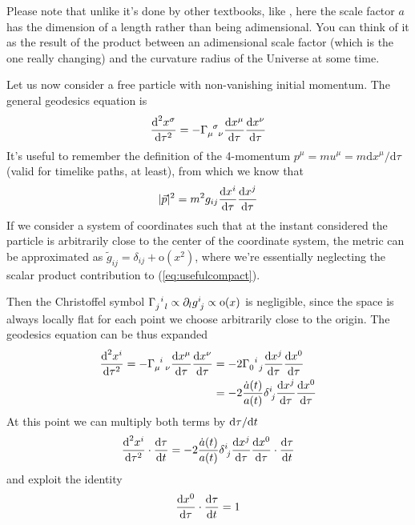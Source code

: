 Please note that unlike it's done by other textbooks, like \cite{carroll}, here the scale factor $a$ has the dimension of a length rather than being adimensional. You can think of it as the result of the product between an adimensional scale factor (which is the one really changing) and the curvature radius of the Universe at some time.
\par Let us now consider a free particle with non-vanishing initial momentum. The general geodesics equation is
\begin{equation}
    \frac{\text{d}^{2}x^{\sigma}}{\text{d}\tau^{2}} = -\Gamma_{\mu\;\;\nu}^{\;\;\sigma}\frac{\text{d}x^{\mu}}{\text{d}\tau}\frac{\text{d}x^{\nu}}{\text{d}\tau}
    \label{eq:geodesicsequation}
\end{equation}
It's useful to remember the definition of the 4-momentum $p^{\mu} = mu^{\mu} = m\text{d}x^{\mu}/\text{d}\tau$ (valid for timelike paths, at least), from which we know that
\begin{equation*}
    |\vec{p}|^{2} = m^{2}g_{ij}\frac{\text{d}x^{i}}{\text{d}\tau}\frac{\text{d}x^{j}}{\text{d}\tau}
\end{equation*}
If we consider a system of coordinates such that at the instant considered the particle is arbitrarily close to the center of the coordinate system, the metric can be approximated as $\tilde{g}_{ij} = \delta_{ij} + \text{o}(x^{2})$, where we're essentially neglecting the scalar product contribution to (\ref{eq:usefulcompact}).
\par Then the Christoffel symbol $\Gamma_{j\;\;l}^{\;\;i} \propto \partial_{l}g^{i}_{\;j} \propto \text{o}(x)$ is negligible, since the space is always locally flat for each point we choose arbitrarily close to the origin. The geodesics equation can be thus expanded 
\begin{align*}
    \frac{\text{d}^{2}x^{i}}{\text{d}\tau^{2}} = -\Gamma_{\mu\;\;\nu}^{\;\;i}\frac{\text{d}x^{\mu}}{\text{d}\tau}\frac{\text{d}x^{\nu}}{\text{d}\tau} &= -2\Gamma_{0\;\;j}^{\;\;i}\frac{\text{d}x^{j}}{\text{d}\tau}\frac{\text{d}x^{0}}{\text{d}\tau}\\
    & = -2\frac{\dot{a}(t)}{a(t)}\delta^{i}_{\;j}\frac{\text{d}x^{j}}{\text{d}\tau}\frac{\text{d}x^{0}}{\text{d}\tau}
\end{align*}
At this point we can multiply both terms by $\text{d}\tau/\text{d}t$
\begin{equation}
    \frac{\text{d}^{2}x^{i}}{\text{d}\tau^{2}}\cdot \frac{\text{d}\tau}{\text{d}t} = -2\frac{\dot{a}(t)}{a(t)}\delta^{i}_{\;j}\frac{\text{d}x^{j}}{\text{d}\tau}\frac{\text{d}x^{0}}{\text{d}\tau}\cdot \frac{\text{d}\tau}{\text{d}t}
\end{equation}
and exploit the identity
\begin{equation}
    \frac{\text{d}x^{0}}{\text{d}\tau}\cdot \frac{\text{d}\tau}{\text{d}t} = 1
\end{equation}
